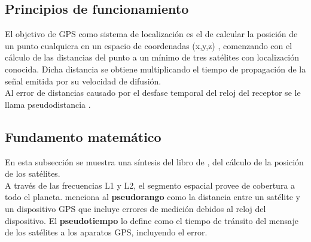 



\subsection{Principios de funcionamiento}

El objetivo de GPS como sistema de localización es el de calcular la posición de un punto cualquiera en un espacio de coordenadas (x,y,z) \citep{sonnenberg2013radar}, comenzando con el cálculo de las distancias del punto a un mínimo de tres satélites con localización conocida. Dicha distancia se obtiene multiplicando el tiempo de propagación de la señal emitida por su velocidad de difusión.\\

Al error de distancias causado por el desfase temporal del reloj del receptor se le llama pseudodistancia \citep{pozo2000sistema}.


\subsection{Fundamento matemático}

En esta subsección se muestra una síntesis del libro de \cite{farrell2008aided}, del cálculo de la posición de los satélites.\\

A través de las frecuencias L1 y L2, el segmento espacial provee de cobertura a todo el planeta. \cite{farrell2008aided} menciona al \textbf{pseudorango} como la distancia entre un satélite y un dispositivo GPS que incluye errores de medición debidos al reloj del dispositivo. El \textbf{pseudotiempo} lo define como el tiempo de tránsito del mensaje de los satélites a los aparatos GPS, incluyendo el error. \\

